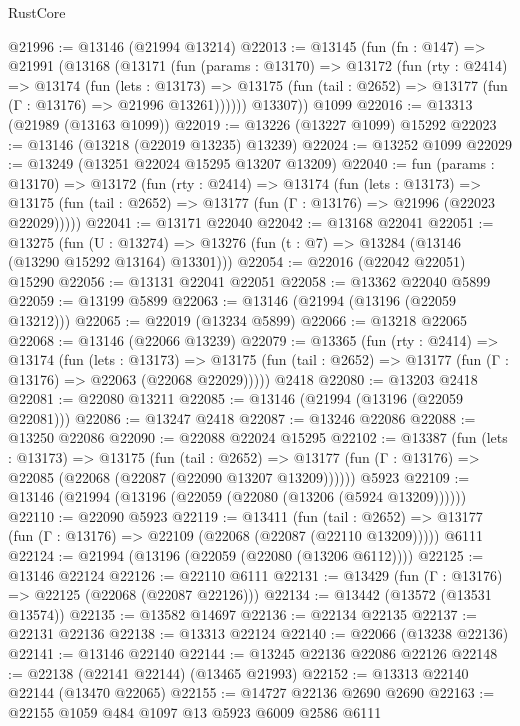 \begin{lexlean}{RustCore}
\begin{coremodule}
@21996 := @13146 (@21994 @13214)
@22013 := @13145
    (fun (fn : @147) =>
    @21991
      (@13168
        (@13171
          (fun (params : @13170) =>
          @13172
            (fun (rty : @2414) =>
            @13174
              (fun (lets : @13173) =>
              @13175 (fun (tail : @2652) => @13177 (fun (Γ : @13176) => @21996 @13261))))))
        @13307))
    @1099
@22016 := @13313 (@21989 (@13163 @1099))
@22019 := @13226 (@13227 @1099) @15292
@22023 := @13146 (@13218 (@22019 @13235) @13239)
@22024 := @13252 @1099
@22029 := @13249 (@13251 @22024 @15295 @13207 @13209)
@22040 := fun (params : @13170) =>
  @13172
    (fun (rty : @2414) =>
    @13174
      (fun (lets : @13173) =>
      @13175 (fun (tail : @2652) => @13177 (fun (Γ : @13176) => @21996 (@22023 @22029)))))
@22041 := @13171 @22040
@22042 := @13168 @22041
@22051 := @13275
    (fun (U : @13274) => @13276 (fun (t : @7) => @13284 (@13146 (@13290 @15292 @13164) @13301)))
@22054 := @22016 (@22042 @22051) @15290
@22056 := @13131 @22041 @22051
@22058 := @13362 @22040 @5899
@22059 := @13199 @5899
@22063 := @13146 (@21994 (@13196 (@22059 @13212)))
@22065 := @22019 (@13234 @5899)
@22066 := @13218 @22065
@22068 := @13146 (@22066 @13239)
@22079 := @13365
    (fun (rty : @2414) =>
    @13174
      (fun (lets : @13173) =>
      @13175 (fun (tail : @2652) => @13177 (fun (Γ : @13176) => @22063 (@22068 @22029)))))
    @2418
@22080 := @13203 @2418
@22081 := @22080 @13211
@22085 := @13146 (@21994 (@13196 (@22059 @22081)))
@22086 := @13247 @2418
@22087 := @13246 @22086
@22088 := @13250 @22086
@22090 := @22088 @22024 @15295
@22102 := @13387
    (fun (lets : @13173) =>
    @13175
      (fun (tail : @2652) =>
      @13177 (fun (Γ : @13176) => @22085 (@22068 (@22087 (@22090 @13207 @13209))))))
    @5923
@22109 := @13146 (@21994 (@13196 (@22059 (@22080 (@13206 (@5924 @13209))))))
@22110 := @22090 @5923
@22119 := @13411
    (fun (tail : @2652) => @13177 (fun (Γ : @13176) => @22109 (@22068 (@22087 (@22110 @13209)))))
    @6111
@22124 := @21994 (@13196 (@22059 (@22080 (@13206 @6112))))
@22125 := @13146 @22124
@22126 := @22110 @6111
@22131 := @13429 (fun (Γ : @13176) => @22125 (@22068 (@22087 @22126)))
@22134 := @13442 (@13572 (@13531 @13574))
@22135 := @13582 @14697
@22136 := @22134 @22135
@22137 := @22131 @22136
@22138 := @13313 @22124
@22140 := @22066 (@13238 @22136)
@22141 := @13146 @22140
@22144 := @13245 @22136 @22086 @22126
@22148 := @22138 (@22141 @22144) (@13465 @21993)
@22152 := @13313 @22140 @22144 (@13470 @22065)
@22155 := @14727 @22136 @2690 @2690
@22163 := @22155 @1059 @484 @1097 @13 @5923 @6009 @2586 @6111

\end{coremodule}
\end{lexlean}
